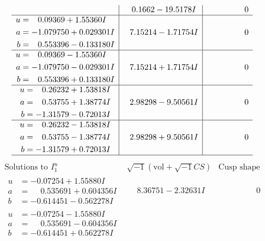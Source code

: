 \documentclass[1p]{elsarticle_modified}
\theoremstyle{definition}
\newcommand{\I}{\sqrt{-1}}
\begin{document}
$$\begin{array}{c|c|c}
 & \phantom{-}0.1662 - 19.5178 I & \phantom{-0.000000 } 0 \\ \hline\begin{aligned}
u &= \phantom{-}0.09369 + 1.55360 I \\
a &= -1.079750 + 0.029301 I \\
b &= \phantom{-}0.553396 - 0.133180 I\end{aligned}
 & \phantom{-}7.15214 - 1.71754 I & \phantom{-0.000000 } 0 \\ \hline\begin{aligned}
u &= \phantom{-}0.09369 - 1.55360 I \\
a &= -1.079750 - 0.029301 I \\
b &= \phantom{-}0.553396 + 0.133180 I\end{aligned}
 & \phantom{-}7.15214 + 1.71754 I & \phantom{-0.000000 } 0 \\ \hline\begin{aligned}
u &= \phantom{-}0.26232 + 1.53818 I \\
a &= \phantom{-}0.53755 + 1.38774 I \\
b &= -1.31579 - 0.72013 I\end{aligned}
 & \phantom{-}2.98298 - 9.50561 I & \phantom{-0.000000 } 0 \\ \hline\begin{aligned}
u &= \phantom{-}0.26232 - 1.53818 I \\
a &= \phantom{-}0.53755 - 1.38774 I \\
b &= -1.31579 + 0.72013 I\end{aligned}
 & \phantom{-}2.98298 + 9.50561 I & \phantom{-0.000000 } 0\\
 \hline 
 \end{array}$$\newpage$$\begin{array}{c|c|c}  
\text{Solutions to }I^u_{1}& \I (\text{vol} + \sqrt{-1}CS) & \text{Cusp shape}\\
 \hline 
\begin{aligned}
u &= -0.07254 + 1.55880 I \\
a &= \phantom{-}0.535691 + 0.604356 I \\
b &= -0.614451 - 0.562278 I\end{aligned}
 & \phantom{-}8.36751 - 2.32631 I & \phantom{-0.000000 } 0 \\ \hline\begin{aligned}
u &= -0.07254 - 1.55880 I \\
a &= \phantom{-}0.535691 - 0.604356 I \\
b &= -0.614451 + 0.562278 I\end{aligned}

\end{array}$$
\end{document}
